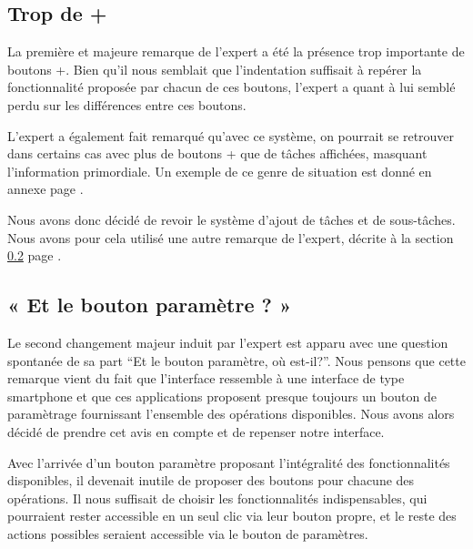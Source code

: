 \documentclass[11pt]{article}
\begin{document}
\subsection{Trop de +}

La première et majeure remarque de l'expert a été la présence trop
importante de boutons +. Bien qu'il nous semblait que l'indentation
suffisait à repérer la fonctionnalité proposée par chacun de ces
boutons, l'expert a quant à lui semblé perdu sur les différences entre
ces boutons.

L'expert a également fait remarqué qu'avec ce système, on pourrait se
retrouver dans certains cas avec plus de boutons + que de tâches
affichées, masquant l'information primordiale. Un exemple de ce genre
de situation est donné en annexe page \pageref{ann:plusplusplus}.

Nous avons donc décidé de revoir le système d'ajout de tâches et de
sous-tâches. Nous avons pour cela utilisé une autre remarque de
l'expert, décrite à la section \ref{subsec:parameterButton} page
\pageref{subsec:parameterButton}.




\subsection{« Et le bouton paramètre ? »}
\label{subsec:parameterButton}


Le second changement majeur induit par l'expert est apparu avec une
question spontanée de sa part ``Et le bouton paramètre, où
est-il?''. Nous pensons que cette remarque vient du fait que
l'interface ressemble à une interface de type smartphone et que ces
applications proposent presque toujours un bouton de paramètrage
fournissant l'ensemble des opérations disponibles. Nous avons alors
décidé de prendre cet avis en compte et de repenser notre interface.

Avec l'arrivée d'un bouton paramètre proposant l'intégralité des
fonctionnalités disponibles, il devenait inutile de proposer des
boutons pour chacune des opérations. Il nous suffisait de choisir les
fonctionnalités indispensables, qui pourraient rester accessible en un
seul clic via leur bouton propre, et le reste des actions possibles
seraient accessible via le bouton de paramètres.
\end{document}
